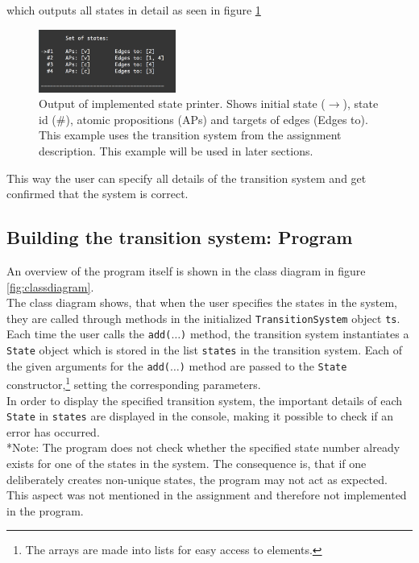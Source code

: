 which outputs all states in detail as seen in figure \ref{fig:stateprint}

\begin{figure}[H]
    \centering
    \includegraphics[width=0.4\textwidth]{fig/stateprinter.png}
    \caption{Output of implemented state printer. Shows initial state ($\rightarrow$), state id (\#), atomic propositions (APs) and targets of edges (Edges to). This example uses the transition system from the assignment description. This example will be used in later sections.}
    \label{fig:stateprint}
\end{figure}

This way the user can specify all details of the transition system and get confirmed that the system is correct.

\subsection{Building the transition system: Program}

An overview of the program itself is shown in the class diagram in figure \ref{fig:classdiagram}. \\


The class diagram shows, that when the user specifies the states in the system, they are called through methods in the initialized \texttt{TransitionSystem} object \texttt{ts}. Each time the user calls the \texttt{add($\hdots$)} method, the transition system instantiates a \texttt{State} object which is stored in the list \texttt{states} in the transition system. Each of the given arguments for the \texttt{add($\hdots$)} method are passed to the \texttt{State} constructor,\footnote{The arrays are made into lists for easy access to elements.} setting the corresponding parameters. \\ 

In order to display the specified transition system, the important details of each \texttt{State} in \texttt{states} are displayed in the console, making it possible to check if an error has occurred. \\

*Note: The program does not check whether the specified state number already exists for one of the states in the system. The consequence is, that if one deliberately creates non-unique states, the program may not act as expected. This aspect was not mentioned in the assignment and therefore not implemented in the program.


